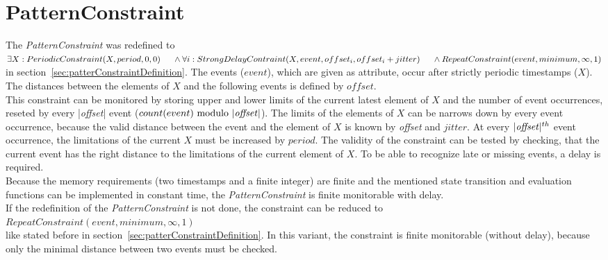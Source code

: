 \section{PatternConstraint}
	The \emph{PatternConstraint} was redefined to\\[10pt]
	\begin{math}
		\exists X: PeriodicConstraint(X, period, 0, 0)\\
		\text{\hspace{.5cm}} \land \forall i: StrongDelayContraint(X, event, offset_i, offset_i+jitter)\\
		\text{\hspace{.5cm}} \land RepeatConstraint(event, minimum, \infty, 1)
	\end{math}\\[10pt]
	in section~\ref{sec:patterConstraintDefinition}. The events ($event$), which are given as attribute, occur after strictly periodic timestamps ($X$). The distances between the elements of $X$ and the following events is defined by $offset$.\\
	This constraint can be monitored by storing upper and lower limits of the current latest element of $X$ and the number of event occurrences, reseted by every |\emph{offset}| event ($count(event)\text{ modulo |\emph{offset}}|$). The limits of the elements of $X$ can be narrows down by every event occurrence, because the valid distance between the event and the element of $X$ is known by \emph{offset} and $jitter$. At every $|\text{\emph{offset}}|^{th}$ event occurrence, the limitations of the current $X$ must be increased by $period$. The validity of the constraint can be tested by checking, that the current event has the right distance to the limitations of the current element of $X$. To be able to recognize late or missing events, a delay is required.\\
	Because the memory requirements (two timestamps and a finite integer) are finite and the mentioned state transition and evaluation functions can be implemented in constant time, the \emph{PatternConstraint} is finite monitorable with delay.\\[10 pt]
	If the redefinition of the \emph{PatternConstraint} is not done, the constraint can be reduced to\\[10pt]
	\begin{math}
		RepeatConstraint(event, minimum, \infty, 1)
	\end{math}\\[10pt]
	like stated before in section~\ref{sec:patterConstraintDefinition}. In this variant, the constraint is finite monitorable (without delay), because only the minimal distance between two events must be checked.
	
